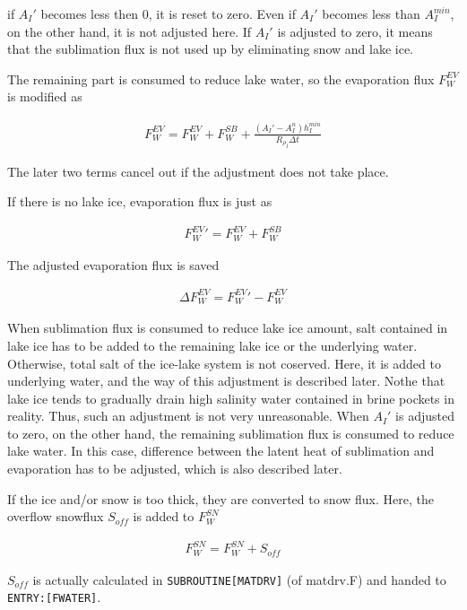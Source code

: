 if \(A_I'\) becomes less then 0, it is reset to zero. Even if \(A_I'\)
becomes less than \(A_I^{min}\), on the other hand, it is not adjusted
here. If \(A_I'\) is adjusted to zero, it means that the sublimation
flux is not used up by eliminating snow and lake ice.

The remaining part is consumed to reduce lake water, so the evaporation
flux \(F_W^{EV}\) is modified as

\begin{eqnarray}
    F_W^{EV} = F_W^{EV} + F_W^{SB} + \frac{(A_I'-A_I^n) h_I^{min}}{R_{\rho_I}\Delta t}
\end{eqnarray}

The later two terms cancel out if the adjustment does not take place.

If there is no lake ice, evaporation flux is just as

\begin{eqnarray}
    F_W^{EV}{'} = F_W^{EV} + F_W^{SB}
\end{eqnarray}

The adjusted evaporation flux is saved

\begin{eqnarray}
    \Delta F_W^{EV} = F_W^{EV}{'}-  F_W^{EV}
\end{eqnarray}

When sublimation flux is consumed to reduce lake ice amount, salt
contained in lake ice has to be added to the remaining lake ice or the
underlying water. Otherwise, total salt of the ice-lake system is not
coserved. Here, it is added to underlying water, and the way of this
adjustment is described later. Nothe that lake ice tends to gradually
drain high salinity water contained in brine pockets in reality. Thus,
such an adjustment is not very unreasonable. When \(A_I'\) is adjusted
to zero, on the other hand, the remaining sublimation flux is consumed
to reduce lake water. In this case, difference between the latent heat
of sublimation and evaporation has to be adjusted, which is also
described later.

If the ice and/or snow is too thick, they are converted to snow flux.
Here, the overflow snowflux \(S_{off}\) is added to \({F_W^{SN}}\)

\begin{eqnarray}
    F_W^{SN} = F_W^{SN} + S_{off}
\end{eqnarray}

\(S_{off}\) is actually calculated in \texttt{SUBROUTINE{[}MATDRV{]}}
(of matdrv.F) and handed to \texttt{ENTRY:{[}FWATER{]}}.

